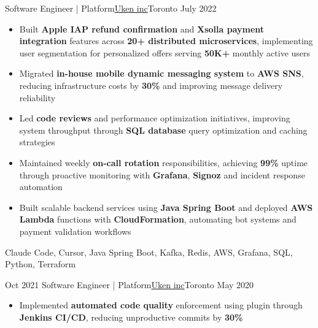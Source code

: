 %
%
%
\begin{experiences}
  \experienceCurrent
    {Software Engineer | Platform}{\href{https://uken.com}{Uken inc}}{Toronto}
    {July 2022} {
                    \begin{itemize}
                        \setlength\itemsep{0.6em}

                        \item Built \textbf{Apple IAP refund confirmation} and \textbf{Xsolla payment integration} features across \textbf{20+ distributed microservices}, implementing user segmentation for personalized offers serving \textbf{50K+} monthly active users

                        \item Migrated \textbf{in-house mobile dynamic messaging system} to \textbf{AWS SNS}, reducing infrastructure costs by \textbf{30\%} and improving message delivery reliability

                        \item Led \textbf{code reviews} and performance optimization initiatives, improving system throughput through \textbf{SQL database} query optimization and caching strategies

                        \item Maintained weekly \textbf{on-call rotation} responsibilities, achieving \textbf{99\%} uptime through proactive monitoring with \textbf{Grafana}, \textbf{Signoz} and incident response automation

                        \item Built scalable backend services using \textbf{Java Spring Boot} and deployed \textbf{AWS Lambda} functions with \textbf{CloudFormation}, automating bot systems and payment validation workflows
                    \end{itemize}
                    }
                    {Claude Code, Cursor, Java Spring Boot, Kafka, Redis, AWS, Grafana, SQL, Python, Terraform}

  \emptySeparator
  \experience
    {Oct 2021}   {Software Engineer | Platform}{\href{https://uken.com}{Uken inc}}{Toronto}
    {May 2020} {
                    \begin{itemize}
                        \setlength\itemsep{0.6em}
                        \item Implemented \textbf{automated code quality} enforcement using  plugin through \textbf{Jenkins CI/CD}, reducing unproductive commits by \textbf{30\%}


\end{itemize}}
\end{experiences}
